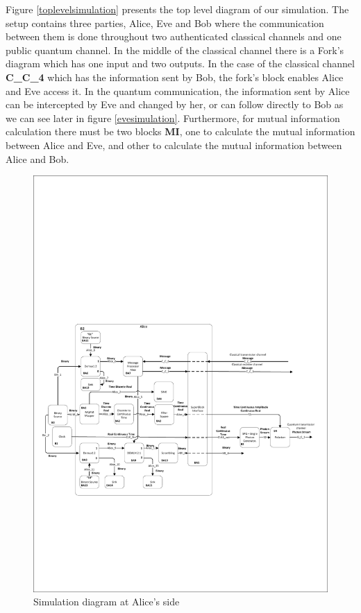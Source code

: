 Figure \ref{toplevelsimulation} presents the top level diagram of our simulation. The setup contains three parties, Alice, Eve and Bob where the communication between them is done throughout two authenticated classical channels and one public quantum channel. In the middle of the classical channel there is a Fork's diagram which has one input and two outputs. In the case of the classical channel \textbf{C\_C\_4} which has the information sent by Bob, the fork's block enables Alice and Eve access it. In the quantum communication, the information sent by Alice can be intercepted by Eve and changed by her, or can follow directly to Bob as we can see later in figure \ref{evesimulation}. Furthermore, for mutual information calculation there must be two blocks \textbf{MI}, one to calculate the mutual information between Alice and Eve, and other to calculate the mutual information between Alice and Bob.

\begin{figure}[h]
    \centering
        \includegraphics[clip, trim=0.5cm 6cm 0.5cm 10cm, width=1.00\textwidth]{./sdf/bb84_with_discrete_variables/figures_raw/Simulation_Alice_bb84.pdf}
    \caption{Simulation diagram at Alice's side}\label{alicesimulation}
\end{figure}


